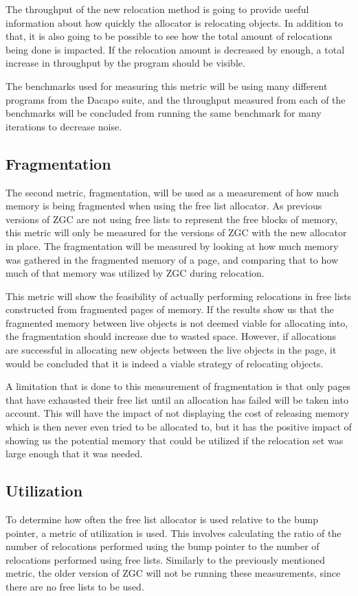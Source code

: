 The throughput of the new relocation method is going to provide useful information about how quickly the allocator is relocating objects. In addition to that, it is also going to be possible to see how the total amount of relocations being done is impacted. If the relocation amount is decreased by enough, a total increase in throughput by the program should be visible.

The benchmarks used for measuring this metric will be using many different programs from the Dacapo suite, and the throughput measured from each of the benchmarks will be concluded from running the same benchmark for many iterations to decrease noise.

\subsection{Fragmentation}
The second metric, fragmentation, will be used as a measurement of how much memory is being fragmented when using the free list allocator. As previous versions of ZGC are not using free lists to represent the free blocks of memory, this metric will only be measured for the versions of ZGC with the new allocator in place. The fragmentation will be measured by looking at how much memory was gathered in the fragmented memory of a page, and comparing that to how much of that memory was utilized by ZGC during relocation.

This metric will show the feasibility of actually performing relocations in free lists constructed from fragmented pages of memory. If the results show us that the fragmented memory between live objects is not deemed viable for allocating into, the fragmentation should increase due to wasted space. However, if allocations are successful in allocating new objects between the live objects in the page, it would be concluded that it is indeed a viable strategy of relocating objects.

A limitation that is done to this measurement of fragmentation is that only pages that have exhausted their free list until an allocation has failed will be taken into account. This will have the impact of not displaying the cost of releasing memory which is then never even tried to be allocated to, but it has the positive impact of showing us the potential memory that could be utilized if the relocation set was large enough that it was needed.

\subsection{Utilization}
To determine how often the free list allocator is used relative to the bump pointer, a metric of utilization is used. This involves calculating the ratio of the number of relocations performed using the bump pointer to the number of relocations performed using free lists. Similarly to the previously mentioned metric, the older version of ZGC will not be running these measurements, since there are no free lists to be used.

